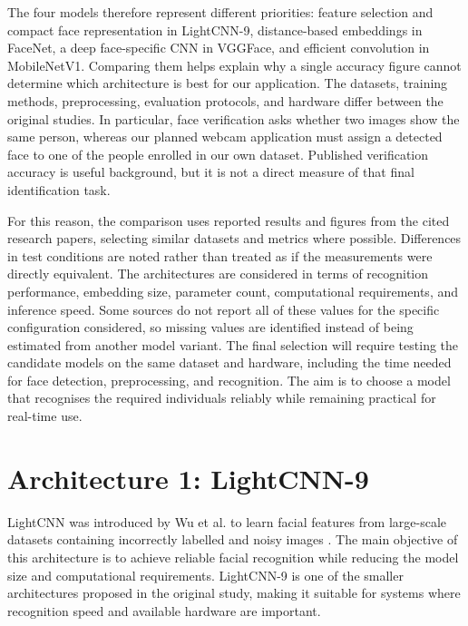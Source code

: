 \documentclass[11pt,a4paper,twocolumn]{article}
\begin{document}
The four models therefore represent different priorities: feature selection and compact face representation in LightCNN-9, distance-based embeddings in FaceNet, a deep face-specific CNN in VGGFace, and efficient convolution in MobileNetV1. Comparing them helps explain why a single accuracy figure cannot determine which architecture is best for our application. The datasets, training methods, preprocessing, evaluation protocols, and hardware differ between the original studies. In particular, face verification asks whether two images show the same person, whereas our planned webcam application must assign a detected face to one of the people enrolled in our own dataset. Published verification accuracy is useful background, but it is not a direct measure of that final identification task.

For this reason, the comparison uses reported results and figures from the cited research papers, selecting similar datasets and metrics where possible. Differences in test conditions are noted rather than treated as if the measurements were directly equivalent. The architectures are considered in terms of recognition performance, embedding size, parameter count, computational requirements, and inference speed. Some sources do not report all of these values for the specific configuration considered, so missing values are identified instead of being estimated from another model variant. The final selection will require testing the candidate models on the same dataset and hardware, including the time needed for face detection, preprocessing, and recognition. The aim is to choose a model that recognises the required individuals reliably while remaining practical for real-time use.



\section{Architecture 1: LightCNN-9}

LightCNN was introduced by Wu et al. to learn facial features from large-scale datasets containing incorrectly labelled and noisy images \cite{wu2018lightcnn}. The main objective of this architecture is to achieve reliable facial recognition while reducing the model size and computational requirements. LightCNN-9 is one of the smaller architectures proposed in the original study, making it suitable for systems where recognition speed and available hardware are important.
\end{document}
